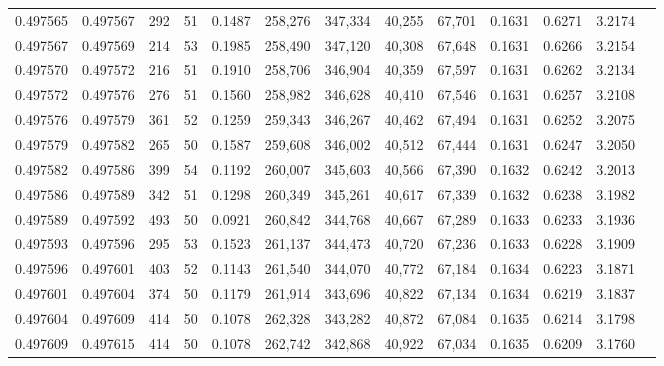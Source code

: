 \begin{tabular}{rrrrrrrrrrrrr}
0.497565 & 0.497567 & 292 &  51 &                                     0.1487 & 258,276 & 347,334 &  40,255 &  67,701 & 0.1631 & 0.6271 & 3.2174 \\
0.497567 & 0.497569 & 214 &  53 &                                     0.1985 & 258,490 & 347,120 &  40,308 &  67,648 & 0.1631 & 0.6266 & 3.2154 \\
0.497570 & 0.497572 & 216 &  51 &                                     0.1910 & 258,706 & 346,904 &  40,359 &  67,597 & 0.1631 & 0.6262 & 3.2134 \\
0.497572 & 0.497576 & 276 &  51 &                                     0.1560 & 258,982 & 346,628 &  40,410 &  67,546 & 0.1631 & 0.6257 & 3.2108 \\
0.497576 & 0.497579 & 361 &  52 &                                     0.1259 & 259,343 & 346,267 &  40,462 &  67,494 & 0.1631 & 0.6252 & 3.2075 \\
0.497579 & 0.497582 & 265 &  50 &                                     0.1587 & 259,608 & 346,002 &  40,512 &  67,444 & 0.1631 & 0.6247 & 3.2050 \\
0.497582 & 0.497586 & 399 &  54 &                                     0.1192 & 260,007 & 345,603 &  40,566 &  67,390 & 0.1632 & 0.6242 & 3.2013 \\
0.497586 & 0.497589 & 342 &  51 &                                     0.1298 & 260,349 & 345,261 &  40,617 &  67,339 & 0.1632 & 0.6238 & 3.1982 \\
0.497589 & 0.497592 & 493 &  50 &                                     0.0921 & 260,842 & 344,768 &  40,667 &  67,289 & 0.1633 & 0.6233 & 3.1936 \\
0.497593 & 0.497596 & 295 &  53 &                                     0.1523 & 261,137 & 344,473 &  40,720 &  67,236 & 0.1633 & 0.6228 & 3.1909 \\
0.497596 & 0.497601 & 403 &  52 &                                     0.1143 & 261,540 & 344,070 &  40,772 &  67,184 & 0.1634 & 0.6223 & 3.1871 \\
0.497601 & 0.497604 & 374 &  50 &                                     0.1179 & 261,914 & 343,696 &  40,822 &  67,134 & 0.1634 & 0.6219 & 3.1837 \\
0.497604 & 0.497609 & 414 &  50 &                                     0.1078 & 262,328 & 343,282 &  40,872 &  67,084 & 0.1635 & 0.6214 & 3.1798 \\
0.497609 & 0.497615 & 414 &  50 &                                     0.1078 & 262,742 & 342,868 &  40,922 &  67,034 & 0.1635 & 0.6209 & 3.1760 \\

\end{tabular}
